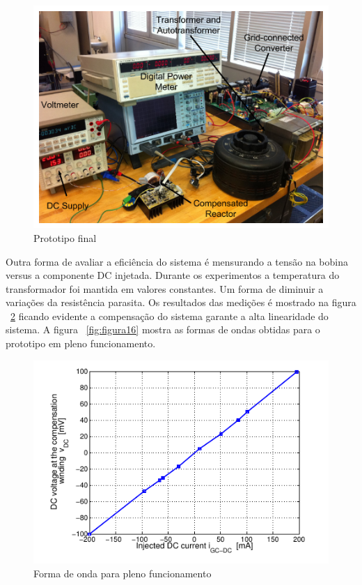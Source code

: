 \documentclass[paper=a4, fontsize=11pt]{article}
\begin{document}
\begin{figure}[!ht]
	\centering
	\includegraphics[scale=.8]{fig13.png}
    \caption{Prototipo final}
    \label{fig:figura13}
\end{figure}

Outra forma de avaliar a eficiência do sistema é mensurando a tensão na bobina versus
a componente DC injetada. Durante os experimentos a temperatura do transformador foi
mantida em valores constantes. Um forma de diminuir a variações da resistência 
parasita. Os resultados das medições é mostrado na figura ~\ref{fig:figura14} ficando
evidente a compensação do sistema garante a alta linearidade do sistema.
A figura ~\ref{fig:figura16} mostra as formas de ondas obtidas para o
prototipo em pleno funcionamento.
\begin{figure}[!ht]
	\centering
	\includegraphics[scale=.8]{fig14.png}
    \caption{Forma de onda para pleno funcionamento}
    \label{fig:figura14}
\end{figure}
\end{document}
